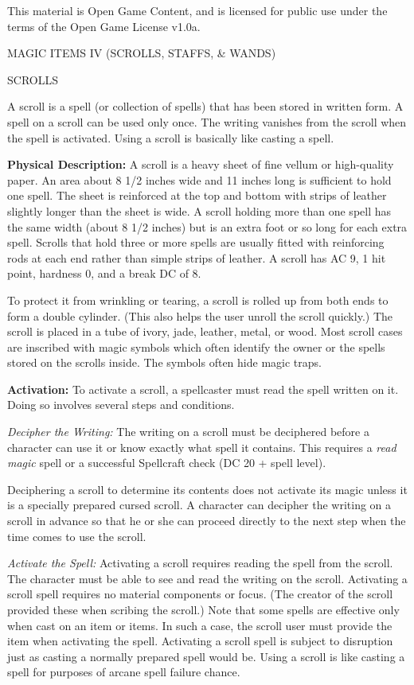 \documentclass{article}
\begin{document}
This material is Open Game Content, and is licensed for public use under the terms 
of the Open Game License v1.0a.

{\LARGE{}MAGIC ITEMS IV (SCROLLS, STAFFS, \& WANDS)}

\vspace{12pt}
SCROLLS

A scroll is a spell (or collection of spells) that has been stored in written form. 
A spell on a scroll can be used only once. The writing vanishes from the scroll 
when the spell is activated. Using a scroll is basically like casting a spell.

\textbf{Physical Description:} A scroll is a heavy sheet of fine vellum or high-quality 
paper. An area about 8 1/2 inches wide and 11 inches long is sufficient to hold 
one spell. The sheet is reinforced at the top and bottom with strips of leather 
slightly longer than the sheet is wide. A scroll holding more than one spell has 
the same width (about 8 1/2 inches) but is an extra foot or so long for each extra 
spell. Scrolls that hold three or more spells are usually fitted with reinforcing 
rods at each end rather than simple strips of leather. A scroll has AC 9, 1 hit 
point, hardness 0, and a break DC of 8.

To protect it from wrinkling or tearing, a scroll is rolled up from both ends to 
form a double cylinder. (This also helps the user unroll the scroll quickly.) The 
scroll is placed in a tube of ivory, jade, leather, metal, or wood. Most scroll 
cases are inscribed with magic symbols which often identify the owner or the spells 
stored on the scrolls inside. The symbols often hide magic traps.

\textbf{Activation:} To activate a scroll, a spellcaster must read the spell written 
on it. Doing so involves several steps and conditions.

\textit{Decipher the Writing: }The writing on a scroll must be deciphered before 
a character can use it or know exactly what spell it contains. This requires a 
\textit{read magic }spell or a successful Spellcraft check (DC 20 + spell level). 

Deciphering a scroll to determine its contents does not activate its magic unless 
it is a specially prepared cursed scroll. A character can decipher the writing 
on a scroll in advance so that he or she can proceed directly to the next step 
when the time comes to use the scroll.

\textit{Activate the Spell: }Activating a scroll requires reading the spell from 
the scroll. The character must be able to see and read the writing on the scroll. 
Activating a scroll spell requires no material components or focus. (The creator 
of the scroll provided these when scribing the scroll.) Note that some spells are 
effective only when cast on an item or items. In such a case, the scroll user must 
provide the item when activating the spell. Activating a scroll spell is subject 
to disruption just as casting a normally prepared spell would be. Using a scroll 
is like casting a spell for purposes of arcane spell failure chance.
\end{document}
